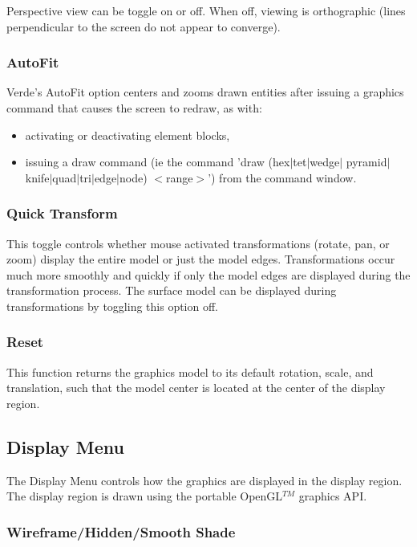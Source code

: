 \documentclass[10pt]{report}
\begin{document}
Perspective view can be toggle on or off.  When off, viewing is orthographic (lines 
perpendicular to the screen do not appear to converge). 

\subsubsection{AutoFit}
\label{autofit_menu}
Verde's AutoFit option centers and zooms drawn entities after issuing a graphics command 
that causes the screen to redraw, as with:

\begin{itemize}
\item activating or deactivating element blocks, 
\item {issuing a draw command (ie the command 'draw (hex$|$tet$|$wedge$|$
       pyramid$|$knife$|$quad$|$tri$|$edge$|$node) $<$range$>$') from the 
       command window.}
\end{itemize}

\subsubsection{Quick Transform}
\label{quick_transform}
This toggle controls whether mouse activated transformations (rotate, pan, or zoom)
display the entire model or just the model edges.  Transformations occur much more
smoothly and quickly if only the model edges are displayed during the transformation 
process.  The surface model can be displayed during transformations by toggling this
option off.

\subsubsection{Reset}
\label{reset}

This function returns the graphics model to its default rotation, 
scale, and translation, such that the model center is located at the 
center of the display region.

\subsection{Display Menu}
\label{display_menu}

The Display Menu controls how the graphics are displayed in the display 
region.  The display region is drawn using the portable OpenGL$^{TM}$
graphics API.  


\subsubsection{Wireframe/Hidden/Smooth Shade}
\label{mode}
\end{document}
